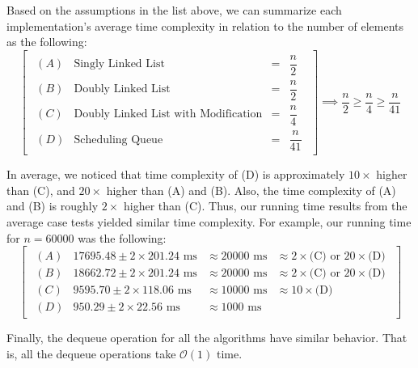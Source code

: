 \documentclass[a4paper,11pt]{kth-mag}
\newcommand*{\skippara}{\par\vspace{\baselineskip} \noindent}
\begin{document}
\skippara Based on the assumptions in the list above, we can summarize each implementation's average time complexity in relation to the number of elements as the following:
\begin{equation*}
    \begin{bmatrix*}
        \begin{array}{llll}
            (A) & \text{Singly Linked List} & = & \dfrac{n}{2} \\[3ex]
            (B) & \text{Doubly Linked List} & = & \dfrac{n}{2} \\[3ex]
            (C) & \text{Doubly Linked List with Modification} & = & \dfrac{n}{4} \\[3ex]
            (D) & \text{Scheduling Queue} & = & \dfrac{n}{41}
        \end{array}
    \end{bmatrix*}
    \implies \frac{n}{2} \ge \frac{n}{4} \ge \frac{n}{41}
\end{equation*}

\skippara In average, we noticed that time complexity of (D) is approximately $10\times$ higher than (C), and $20\times$ higher than (A) and (B).
Also, the time complexity of (A) and (B) is roughly $2\times$ higher than (C).
Thus, our running time results from the average case tests yielded similar time complexity.
For example, our running time for $n=60000$ was the following:
\begin{equation*}
    \begin{bmatrix*}
        \begin{array}{llllll}
            (A) & 17695.48 \pm 2\times 201.24 \text{ ms} & \approx 20000 \text{ ms}  & \approx 2\times\text{(C)}\text{ or } 20\times\text{(D)} \\[1ex]
            (B) & 18662.72 \pm 2\times 201.24 \text{ ms} & \approx 20000 \text{ ms}  & \approx 2\times\text{(C)}\text{ or } 20\times\text{(D)} \\[1ex]
            (C) & 9595.70 \pm 2\times 118.06 \text{ ms} & \approx 10000 \text{ ms} & \approx 10\times\text{(D)} \\[1ex]
            (D) & 950.29 \pm 2\times 22.56 \text{ ms} & \approx 1000 \text{ ms} &
        \end{array}
    \end{bmatrix*}
\end{equation*}

\skippara Finally, the dequeue operation for all the algorithms have similar behavior.
That is, all the dequeue operations take $\mathcal{O}(1)$ time.
\end{document}
